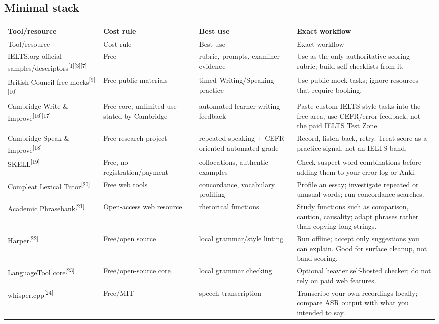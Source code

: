\documentclass[11pt,a4paper]{article}
\newcommand{\src}[1]{\textsuperscript{[#1]}}
\begin{document}
\subsection{Minimal stack}
\begin{longtable}{p{3.2cm}p{2.3cm}p{4.2cm}p{5.2cm}}
\toprule
Tool/resource & Cost rule & Best use & Exact workflow \\
\midrule
\endfirsthead
\toprule
Tool/resource & Cost rule & Best use & Exact workflow \\
\midrule
\endhead
IELTS.org official samples/descriptors\src{1}\src{3}\src{7} & Free & rubric, prompts, examiner evidence & Use as the only authoritative scoring rubric; build self-checklists from it. \\
British Council free mocks\src{9}\src{10} & Free public materials & timed Writing/Speaking practice & Use public mock tasks; ignore resources that require booking. \\
Cambridge Write \& Improve\src{16}\src{17} & Free core, unlimited use stated by Cambridge & automated learner-writing feedback & Paste custom IELTS-style tasks into the free area; use CEFR/error feedback, not the paid IELTS Test Zone. \\
Cambridge Speak \& Improve\src{18} & Free research project & repeated speaking + CEFR-oriented automated grade & Record, listen back, retry. Treat score as a practice signal, not an IELTS band. \\
SKELL\src{19} & Free, no registration/payment & collocations, authentic examples & Check suspect word combinations before adding them to your error log or Anki. \\
Compleat Lexical Tutor\src{20} & Free web tools & concordance, vocabulary profiling & Profile an essay; investigate repeated or unusual words; run concordance searches. \\
Academic Phrasebank\src{21} & Open-access web resource & rhetorical functions & Study functions such as comparison, caution, causality; adapt phrases rather than copying long strings. \\
Harper\src{22} & Free/open source & local grammar/style linting & Run offline; accept only suggestions you can explain. Good for surface cleanup, not band scoring. \\
LanguageTool core\src{23} & Free/open-source core & local grammar checking & Optional heavier self-hosted checker; do not rely on paid web features. \\
whisper.cpp\src{24} & Free/MIT & speech transcription & Transcribe your own recordings locally; compare ASR output with what you intended to say. \\

\end{longtable}
\end{document}
